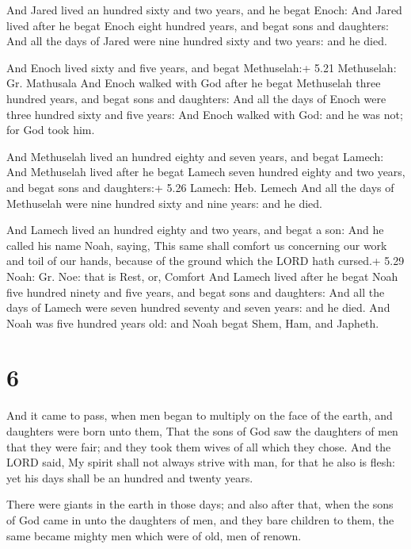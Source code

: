  And Jared lived an hundred sixty and two years, and he
begat Enoch:  And Jared lived after he begat Enoch eight
hundred years, and begat sons and daughters:  And all the
days of Jared were nine hundred sixty and two years: and he died.

 And Enoch lived sixty and five years, and begat
Methuselah:+ 5.21 Methuselah: Gr. Mathusala  And Enoch
walked with God after he begat Methuselah three hundred years, and begat
sons and daughters:  And all the days of Enoch were three
hundred sixty and five years:  And Enoch walked with God:
and he was not; for God took him.

 And Methuselah lived an hundred eighty and seven years,
and begat Lamech:  And Methuselah lived after he begat
Lamech seven hundred eighty and two years, and begat sons and
daughters:+ 5.26 Lamech: Heb. Lemech  And all the days of
Methuselah were nine hundred sixty and nine years: and he died.

 And Lamech lived an hundred eighty and two years, and
begat a son:  And he called his name Noah, saying, This
same shall comfort us concerning our work and toil of our hands, because
of the ground which the LORD hath cursed.+ 5.29 Noah: Gr. Noe: that is
Rest, or, Comfort  And Lamech lived after he begat Noah
five hundred ninety and five years, and begat sons and daughters:
 And all the days of Lamech were seven hundred seventy and
seven years: and he died.  And Noah was five hundred years
old: and Noah begat Shem, Ham, and Japheth.

\hypertarget{section-5}{%
\section{6}\label{section-5}}

 And it came to pass, when men began to multiply on the face
of the earth, and daughters were born unto them,  That the
sons of God saw the daughters of men that they were fair; and they took
them wives of all which they chose.  And the LORD said, My
spirit shall not always strive with man, for that he also is flesh: yet
his days shall be an hundred and twenty years.

 There were giants in the earth in those days; and also
after that, when the sons of God came in unto the daughters of men, and
they bare children to them, the same became mighty men which were of
old, men of renown.

